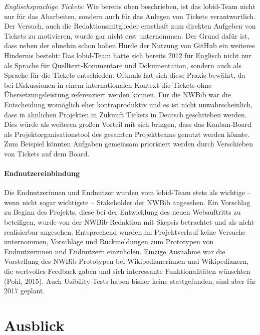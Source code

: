 \documentclass[a4paper,
fontsize=11pt,
oneside,
numbers=noperiodatend,
parskip=half-,
bibliography=totoc,
final
]{scrartcl}
\begin{document}
\emph{Englischsprachige Tickets}: Wie bereits oben beschrieben, ist das
lobid-Team nicht nur für das Abarbeiten, sondern auch für das Anlegen
von Tickets verantwortlich. Der Versuch, auch die Redaktionsmitglieder
ernsthaft zum direkten Aufgeben von Tickets zu motivieren, wurde gar
nicht erst unternommen. Der Grund dafür ist, dass neben der ohnehin
schon hohen Hürde der Nutzung von GitHub ein weiteres Hindernis besteht:
Das lobid-Team hatte sich bereits 2012 für Englisch nicht nur als
Sprache für Quelltext-Kommentare und Dokumentation, sondern auch als
Sprache für die Tickets entschieden. Oftmals hat sich diese Praxis
bewährt, da bei Diskussionen in einem internationalen Kontext die
Tickets ohne Übersetzungsleistung referenziert werden können. Für die
NWBib war die Entscheidung womöglich eher kontraproduktiv und es ist
nicht unwahrscheinlich, dass in ähnlichen Projekten in Zukunft Tickets
in Deutsch geschrieben werden. Dies würde als weiteren großen Vorteil
mit sich bringen, dass das Kanban-Board als Projektorganisationstool des
gesamten Projektteams genutzt werden könnte. Zum Beispiel könnten
Aufgaben gemeinsam priorisiert werden durch Verschieben von Tickets auf
dem Board.

\paragraph{Endnutzereinbindung}\label{endnutzereinbindung}

Die Endnutzerinnen und Endnutzer wurden vom lobid-Team stets als
wichtige -- wenn nicht sogar wichtigste -- Stakeholder der NWBib
angesehen. Ein Vorschlag zu Beginn des Projekts, diese bei der
Entwicklung des neuen Webauftritts zu beteiligen, wurde von der
NWBib-Redaktion mit Skepsis betrachtet und als nicht realisierbar
angesehen. Entsprechend wurden im Projektverlauf keine Versuche
unternommen, Vorschläge und Rückmeldungen zum Prototypen von
Endnutzerinnen und Endnutzern einzuholen. Einzige Ausnahme war die
Vorstellung des NWBib-Prototypen bei Wikipedianerinnen und
Wikipedianern, die wertvolles Feedback gaben und sich interessante
Funktionalitäten wünschten (Pohl, 2015). Auch Usibility-Tests haben
bisher keine stattgefunden, sind aber für 2017 geplant.

\section*{Ausblick}\label{ausblick}
\end{document}
